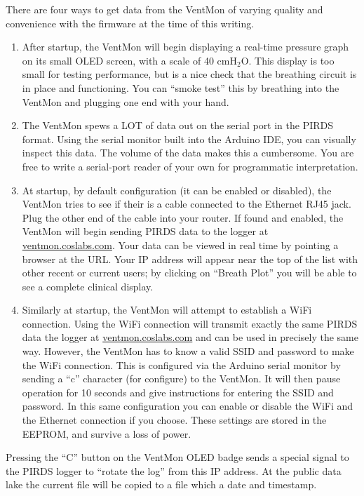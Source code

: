 \documentclass[11pt, letterpaper]{article}
\begin{document}
There are four ways to get data from the VentMon of varying quality and convenience with the firmware at the time of this writing.
\begin{enumerate}
\item After startup, the VentMon will begin displaying a real-time pressure graph on its small OLED screen, with a scale of 40 cmH$_2$O. This display is too small for testing performance, but is a nice check that the breathing circuit is in place and functioning. You can ``smoke test'' this by breathing into the VentMon and plugging one end with your hand.
\item The VentMon spews a LOT of data out on the serial port in the PIRDS format. Using the serial monitor built into the Arduino IDE, you can visually inspect this data. The volume of the data makes this a cumbersome. You are free to write a serial-port reader of your own for programmatic interpretation.
\item At startup, by default configuration (it can be enabled or disabled), the VentMon tries to see if their is a cable connected to the Ethernet RJ45 jack. Plug the other end of the cable into your router. If found and enabled, the VentMon will begin sending PIRDS\cite{PIRDS} data to the logger at \url{ventmon.coslabs.com}\cite{PIRDSlogger}. Your data can be viewed in real time by pointing a browser at the URL. Your IP address will appear near the top of the list with other recent or current users; by clicking on ``Breath Plot'' you will be able to see a complete clinical display.
\item Similarly at startup, the VentMon will attempt to establish a WiFi connection. Using the WiFi connection will transmit exactly the same PIRDS data the logger at \url{ventmon.coslabs.com} and can be used in precisely  the same way. However, the VentMon has to know a valid SSID and password to make the WiFi connection. This is configured via the Arduino serial monitor by sending a ``c'' character (for configure) to the VentMon. It will then pause operation for 10 seconds and give instructions for entering the SSID and password. In this same configuration you can enable or disable the WiFi and the Ethernet connection if you choose. These settings are stored in the EEPROM, and survive a loss of power.
\end{enumerate}

Pressing the ``C'' button on the VentMon OLED badge sends a special signal to the PIRDS logger to ``rotate the log'' from this IP address. At the public data lake the current file will be copied to a file which a date and timestamp.
\end{document}
